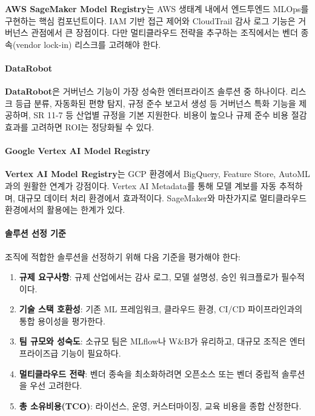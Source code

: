 \textbf{AWS SageMaker Model Registry}는 AWS 생태계 내에서 엔드투엔드 MLOps를 구현하는 핵심 컴포넌트이다. IAM 기반 접근 제어와 CloudTrail 감사 로그 기능은 거버넌스 관점에서 큰 장점이다. 다만 멀티클라우드 전략을 추구하는 조직에서는 벤더 종속(vendor lock-in) 리스크를 고려해야 한다.

\paragraph{DataRobot}

\textbf{DataRobot}은 거버넌스 기능이 가장 성숙한 엔터프라이즈 솔루션 중 하나이다\cite{shankar2022operationalizing}. 리스크 등급 분류, 자동화된 편향 탐지, 규정 준수 보고서 생성 등 거버넌스 특화 기능을 제공하며, SR 11-7 등 산업별 규정을 기본 지원한다. 비용이 높으나 규제 준수 비용 절감 효과를 고려하면 ROI는 정당화될 수 있다.

\paragraph{Google Vertex AI Model Registry}

\textbf{Vertex AI Model Registry}는 GCP 환경에서 BigQuery, Feature Store, AutoML과의 원활한 연계가 강점이다. Vertex AI Metadata를 통해 모델 계보를 자동 추적하며, 대규모 데이터 처리 환경에서 효과적이다. SageMaker와 마찬가지로 멀티클라우드 환경에서의 활용에는 한계가 있다.

\paragraph{솔루션 선정 기준}

조직에 적합한 솔루션을 선정하기 위해 다음 기준을 평가해야 한다:

\begin{enumerate}
  \item \textbf{규제 요구사항}: 규제 산업에서는 감사 로그, 모델 설명성, 승인 워크플로가 필수적이다.
  \item \textbf{기술 스택 호환성}: 기존 ML 프레임워크, 클라우드 환경, CI/CD 파이프라인과의 통합 용이성을 평가한다.
  \item \textbf{팀 규모와 성숙도}: 소규모 팀은 MLflow나 W\&B가 유리하고, 대규모 조직은 엔터프라이즈급 기능이 필요하다.
  \item \textbf{멀티클라우드 전략}: 벤더 종속을 최소화하려면 오픈소스 또는 벤더 중립적 솔루션을 우선 고려한다.
  \item \textbf{총 소유비용(TCO)}: 라이선스, 운영, 커스터마이징, 교육 비용을 종합 산정한다.
\end{enumerate}

